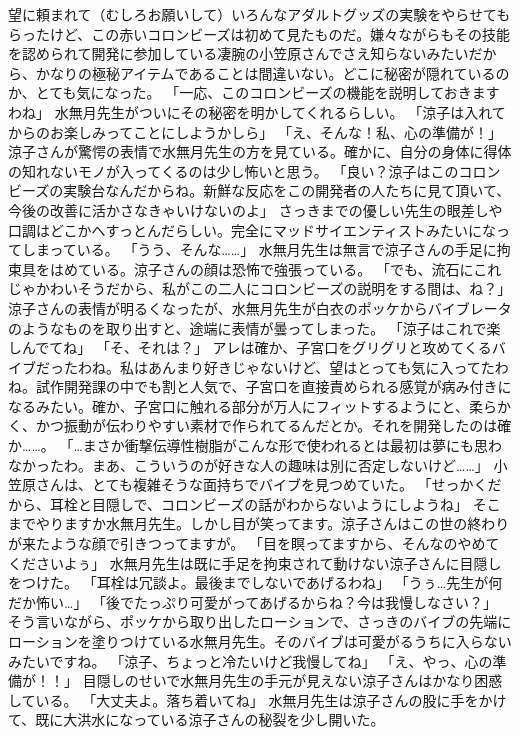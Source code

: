 望に頼まれて（むしろお願いして）いろんなアダルトグッズの実験をやらせてもらったけど、この赤いコロンビーズは初めて見たものだ。嫌々ながらもその技能を認められて開発に参加している凄腕の小笠原さんでさえ知らないみたいだから、かなりの極秘アイテムであることは間違いない。どこに秘密が隠れているのか、とても気になった。
「一応、このコロンビーズの機能を説明しておきますわね」
水無月先生がついにその秘密を明かしてくれるらしい。
「涼子は入れてからのお楽しみってことにしようかしら」
「え、そんな！私、心の準備が！」
涼子さんが驚愕の表情で水無月先生の方を見ている。確かに、自分の身体に得体の知れないモノが入ってくるのは少し怖いと思う。
「良い？涼子はこのコロンビーズの実験台なんだからね。新鮮な反応をこの開発者の人たちに見て頂いて、今後の改善に活かさなきゃいけないのよ」
さっきまでの優しい先生の眼差しや口調はどこかへすっとんだらしい。完全にマッドサイエンティストみたいになってしまっている。
「うう、そんな……」
水無月先生は無言で涼子さんの手足に拘束具をはめている。涼子さんの顔は恐怖で強張っている。
「でも、流石にこれじゃかわいそうだから、私がこの二人にコロンビーズの説明をする間は、ね？」
涼子さんの表情が明るくなったが、水無月先生が白衣のポッケからバイブレータのようなものを取り出すと、途端に表情が曇ってしまった。
「涼子はこれで楽しんでてね」
「そ、それは？」
アレは確か、子宮口をグリグリと攻めてくるバイブだったわね。私はあんまり好きじゃないけど、望はとっても気に入ってたわね。試作開発課の中でも割と人気で、子宮口を直接責められる感覚が病み付きになるみたい。確か、子宮口に触れる部分が万人にフィットするようにと、柔らかく、かつ振動が伝わりやすい素材で作られてるんだとか。それを開発したのは確か……。
「…まさか衝撃伝導性樹脂がこんな形で使われるとは最初は夢にも思わなかったわ。まあ、こういうのが好きな人の趣味は別に否定しないけど……」
小笠原さんは、とても複雑そうな面持ちでバイブを見つめていた。
「せっかくだから、耳栓と目隠しで、コロンビーズの話がわからないようにしようね」
そこまでやりますか水無月先生。しかし目が笑ってます。涼子さんはこの世の終わりが来たような顔で引きつってますが。
「目を瞑ってますから、そんなのやめてくださいよぅ」
水無月先生は既に手足を拘束されて動けない涼子さんに目隠しをつけた。
「耳栓は冗談よ。最後までしないであげるわね」
「うぅ…先生が何だか怖い…」
「後でたっぷり可愛がってあげるからね？今は我慢しなさい？」
そう言いながら、ポッケから取り出したローションで、さっきのバイブの先端にローションを塗りつけている水無月先生。そのバイブは可愛がるうちに入らないみたいですね。
「涼子、ちょっと冷たいけど我慢してね」
「え、やっ、心の準備が！！」
目隠しのせいで水無月先生の手元が見えない涼子さんはかなり困惑している。
「大丈夫よ。落ち着いてね」
水無月先生は涼子さんの股に手をかけて、既に大洪水になっている涼子さんの秘裂を少し開いた。
